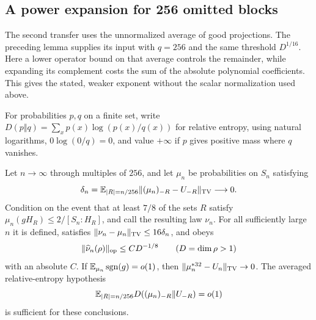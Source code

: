 \subsection{A power expansion for 256 omitted blocks}

The second transfer uses the unnormalized average of good projections.
The preceding lemma supplies its input with $q=256$ and the same
threshold $D^{1/16}$. Here a lower operator bound on that average
controls the remainder, while expanding its complement costs the sum
of the absolute polynomial coefficients. This gives the stated, weaker
exponent without the scalar normalization used above.

For probabilities $p,q$ on a finite set, write
$D(p\Vert q)=\sum_xp(x)\log(p(x)/q(x))$ for relative entropy,
using natural logarithms, $0\log(0/q)=0$, and value $+\infty$
if $p$ gives positive mass where $q$ vanishes.

\begin{theorem}
\label{l:domain-transfer}
Let $n\to\infty$ through multiples of $256$, and let $\mu_n$ be
probabilities on $S_n$ satisfying
\[
 \delta_n=\mathbb E_{|R|=n/256}
       \|(\mu_n)_{-R}-U_{-R}\|_{\mathrm{TV}}\longrightarrow0.
\]
Condition on the event that at least $7/8$ of the sets $R$ satisfy
$\mu_n(gH_R)\le2/[S_n:H_R]$, and call the resulting law $\nu_n$.
For all sufficiently large $n$ it is defined, satisfies
$\|\nu_n-\mu_n\|_{\mathrm{TV}}\le16\delta_n$, and obeys
\[
 \|\widehat\nu_n(\rho)\|_{\mathrm{op}}\le CD^{-1/8}
 \qquad(D=\dim\rho>1)
\]
with an absolute $C$. If $\mathbb E_{\mu_n}\operatorname{sgn}(g)=o(1)$, then
$\|\mu_n^{*32}-U_n\|_{\mathrm{TV}}\to0$.
The averaged relative-entropy hypothesis
\[
 \mathbb E_{|R|=n/256}D((\mu_n)_{-R}\|U_{-R})=o(1)
\]
is sufficient for these conclusions.
\end{theorem}


